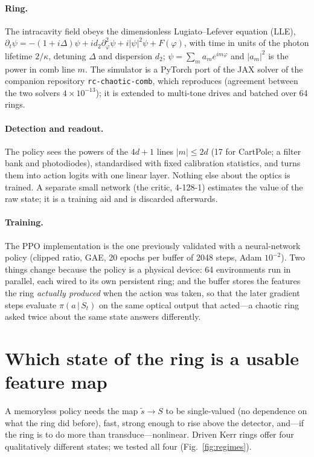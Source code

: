 \documentclass[10pt,a4paper]{article}
\newcommand{\ts}{\tilde s}
\begin{document}
\paragraph{Ring.}  The intracavity field obeys the dimensionless Lugiato--Lefever equation (LLE),
$\partial_t\psi=-(1+i\Delta)\psi+i d_2\partial_\varphi^2\psi+i|\psi|^2\psi+F(\varphi)$, with time in units of the photon
lifetime $2/\kappa$, detuning $\Delta$ and dispersion $d_2$; $\psi=\sum_m a_m e^{im\varphi}$ and $|a_m|^2$ is the power in
comb line $m$.  The simulator is a PyTorch port of the JAX solver of the companion repository \texttt{rc-chaotic-comb}, which
reproduces \cite{ref:prr_2025} (agreement between the two solvers $4\times10^{-13}$); it is extended to multi-tone drives and
batched over 64 rings.
\paragraph{Detection and readout.}  The policy sees the powers of the $4d+1$ lines $|m|\le 2d$ (17 for CartPole; a filter bank and photodiodes), standardised
with fixed calibration statistics, and turns them into action logits with one linear layer.  Nothing else about the
optics is trained.  A separate small network (the critic, 4-128-1) estimates the value of the raw state; it is a training aid and is
discarded afterwards.
\paragraph{Training.}  The PPO implementation is the one previously validated with a neural-network policy (clipped ratio,
GAE, 20 epochs per buffer of 2048 steps, Adam $10^{-2}$).  Two things change because the policy is a physical device: 64
environments run in parallel, each wired to its own persistent ring; and the buffer stores the features the ring
\emph{actually produced} when the action was taken, so that the later gradient steps evaluate $\pi(a\,|\,S_t)$ on the
same optical output that acted---a chaotic ring asked twice about the same state answers differently.

\section{Which state of the ring is a usable feature map}
A memoryless policy needs the map $\ts\to S$ to be single-valued (no dependence on what the ring did before), fast, strong
enough to rise above the detector, and---if the ring is to do more than transduce---nonlinear.  Driven Kerr rings offer
four qualitatively different states; we tested all four (Fig.~\ref{fig:regimes}).
\end{document}
